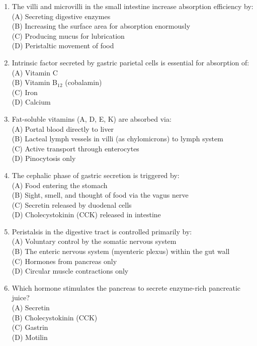 \documentclass{article}
\begin{document}
\begin{enumerate}[label=Q\arabic*.]
\item The villi and microvilli in the small intestine increase absorption efficiency by:
\\(A) Secreting digestive enzymes
\\(B) Increasing the surface area for absorption enormously
\\(C) Producing mucus for lubrication
\\(D) Peristaltic movement of food

\item Intrinsic factor secreted by gastric parietal cells is essential for absorption of:
\\(A) Vitamin C
\\(B) Vitamin B$_{12}$ (cobalamin)
\\(C) Iron
\\(D) Calcium

\item Fat-soluble vitamins (A, D, E, K) are absorbed via:
\\(A) Portal blood directly to liver
\\(B) Lacteal lymph vessels in villi (as chylomicrons) to lymph system
\\(C) Active transport through enterocytes
\\(D) Pinocytosis only

\item The cephalic phase of gastric secretion is triggered by:
\\(A) Food entering the stomach
\\(B) Sight, smell, and thought of food via the vagus nerve
\\(C) Secretin released by duodenal cells
\\(D) Cholecystokinin (CCK) released in intestine

\item Peristalsis in the digestive tract is controlled primarily by:
\\(A) Voluntary control by the somatic nervous system
\\(B) The enteric nervous system (myenteric plexus) within the gut wall
\\(C) Hormones from pancreas only
\\(D) Circular muscle contractions only

\item Which hormone stimulates the pancreas to secrete enzyme-rich pancreatic juice?
\\(A) Secretin
\\(B) Cholecystokinin (CCK)
\\(C) Gastrin
\\(D) Motilin


\end{enumerate}
\end{document}
